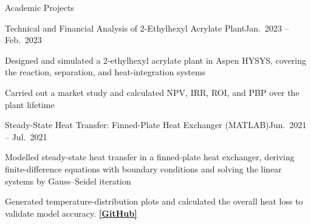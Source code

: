 \documentclass[]{kyvernitis-resume}
\begin{document}
\begin{section}{Academic Projects}
    \begin{project}{Technical and Financial Analysis of 2-Ethylhexyl Acrylate Plant}{Jan.\ 2023 -- Feb.\ 2023}{}
        \item Designed and simulated a 2-ethylhexyl acrylate plant in Aspen HYSYS, covering the reaction, separation, and heat-integration systems
        \item Carried out a market study and calculated NPV, IRR, ROI, and PBP over the plant lifetime
    \end{project}


    \begin{project}{Steady-State Heat Transfer: Finned-Plate Heat Exchanger (MATLAB)}{Jun.\ 2021 -- Jul.\ 2021}{}
        \item Modelled steady-state heat transfer in a finned-plate heat exchanger, deriving finite-difference equations with boundary conditions and solving the linear systems by Gauss--Seidel iteration
        \item Generated temperature-distribution plots and calculated the overall heat loss to validate model accuracy. \href{https://github.com/SinaGhanbarii/Steady-State-Heat-Transfer-Modeling-the-Finned-Plate-H.Ex.}{\textbf{[GitHub]}}
    \end{project}
\end{section}

\end{document}
